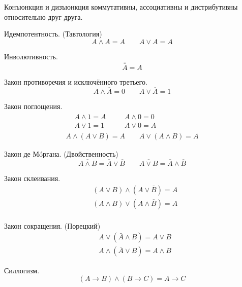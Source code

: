 Конъюнкция и дизъюнкция {\ital коммутативны}, {\ital ассоциативны} и {\ital дистрибутивны} относительно друг друга.
\begin{theorem}
{\bold Идемпотентность.} {\ital\color{desc} (Тавтология)}
$$A\land A=A\qquad A\lor A=A$$
\end{theorem}
\begin{theorem}
{\bold Инволютивность.}
$$\bar{\bar{A}}=A$$
\end{theorem}
\begin{theorem}
{\bold Закон противоречия} и {\bold исключённого третьего.}
$$A\land\overline{A}=0\qquad A\lor\overline{A}=1$$
\end{theorem}
\begin{theorem}
{\bold Закон поглощения.}
$$\begin{gathered}\begin{aligned}
&A\land 1=A &\quad &A\land 0=0\\
&A\lor 1=1 &\quad &A\lor 0=A
\end{aligned}\\
A\land (A\lor B)=A\qquad A\lor (A\land B)=A\end{gathered}$$
\end{theorem}
\begin{theorem}
{\bold Закон де Мóргана.} {\ital\color{desc} (Двойственность)}
$$\overline{A\land B}=\overline{A}\lor\overline{B}\qquad\overline{A\lor B}=\overline{A}\land\overline{B}$$
\end{theorem}
\begin{theorem}
{\bold Закон склеивания.}
$$\begin{aligned}
&(A\lor B)\land(A\lor \overline{B})=A\\
&(A\land B)\lor(A\land \overline{B})=A\\
\end{aligned}$$
\end{theorem}
\begin{theorem}
{\bold Закон сокращения.} {\ital\color{desc} (Порецкий)}
$$\begin{aligned}
&A\lor(\bar{A}\land B)=A\lor B\\
&A\land(\bar{A}\lor B)=A\land B
\end{aligned}$$
\end{theorem}
\begin{theorem}
{\bold Силлогизм.}
$$(A\to B)\land(B\to C)=A\to C$$
\end{theorem}

